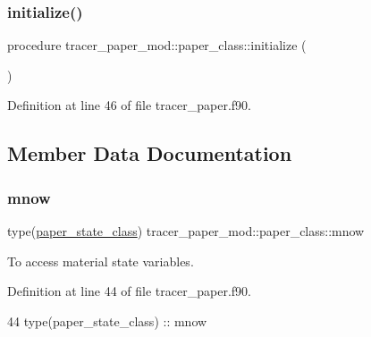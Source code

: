 \subsubsection{\texorpdfstring{initialize()}{initialize()}}
{\footnotesize\ttfamily procedure tracer\+\_\+paper\+\_\+mod\+::paper\+\_\+class\+::initialize (\begin{DoxyParamCaption}{ }\end{DoxyParamCaption})\hspace{0.3cm}{\ttfamily [private]}}



Definition at line 46 of file tracer\+\_\+paper.\+f90.



\subsection{Member Data Documentation}
\mbox{\label{structtracer__paper__mod_1_1paper__class_a7156f27ec83059ac3b701502a4320858}} 
\subsubsection{\texorpdfstring{mnow}{mnow}}
{\footnotesize\ttfamily type(\mbox{\hyperlink{structtracer__paper__mod_1_1paper__state__class}{paper\+\_\+state\+\_\+class}}) tracer\+\_\+paper\+\_\+mod\+::paper\+\_\+class\+::mnow\hspace{0.3cm}{\ttfamily [private]}}



To access material state variables. 



Definition at line 44 of file tracer\+\_\+paper.\+f90.


\begin{DoxyCode}
44         \textcolor{keywordtype}{type}(paper\_state\_class) :: mnow
\end{DoxyCode}
\mbox{\label{structtracer__paper__mod_1_1paper__class_a23ace4a6e578ffccaf1d5dcd91dc09b3}} 

